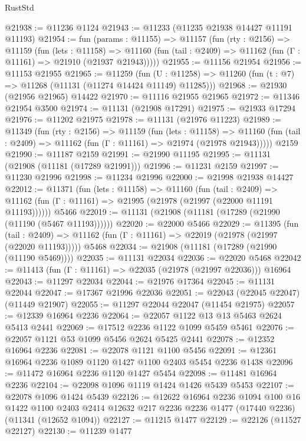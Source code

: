 \begin{lexlean}{RustStd}
\begin{coremodule}
@21938 := @11236 @1124
@21943 := @11233 (@11235 @21938 @14427 @11191 @11193)
@21954 := fun (params : @11155) =>
  @11157
    (fun (rty : @2156) =>
    @11159
      (fun (lets : @11158) =>
      @11160 (fun (tail : @2409) => @11162 (fun (Γ : @11161) => @21910 (@21937 @21943)))))
@21955 := @11156 @21954
@21956 := @11153 @21955
@21965 := @11259
    (fun (U : @11258) => @11260 (fun (t : @7) => @11268 (@11131 (@11274 @14424 @11149) @11285)))
@21968 := @21930 (@21956 @21965) @14422
@21970 := @11116 @21955 @21965
@21972 := @11346 @21954 @3500
@21974 := @11131 (@21908 @17291)
@21975 := @21933 @17294
@21976 := @11202 @21975
@21978 := @11131 (@21976 @11223)
@21989 := @11349
    (fun (rty : @2156) =>
    @11159
      (fun (lets : @11158) =>
      @11160 (fun (tail : @2409) => @11162 (fun (Γ : @11161) => @21974 (@21978 @21943)))))
    @2159
@21990 := @11187 @2159
@21991 := @21990 @11195
@21995 := @11131 (@21908 (@11181 (@17289 @21991)))
@21996 := @11231 @2159
@21997 := @11230 @21996
@21998 := @11234 @21996
@22000 := @21998 @21938 @14427
@22012 := @11371
    (fun (lets : @11158) =>
    @11160
      (fun (tail : @2409) =>
      @11162 (fun (Γ : @11161) => @21995 (@21978 (@21997 (@22000 @11191 @11193))))))
    @5466
@22019 := @11131 (@21908 (@11181 (@17289 (@21990 (@11190 (@5467 @11193))))))
@22020 := @22000 @5466
@22029 := @11395
    (fun (tail : @2409) => @11162 (fun (Γ : @11161) => @22019 (@21978 (@21997 (@22020 @11193)))))
    @5468
@22034 := @21908 (@11181 (@17289 (@21990 (@11190 @5469))))
@22035 := @11131 @22034
@22036 := @22020 @5468
@22042 := @11413 (fun (Γ : @11161) => @22035 (@21978 (@21997 @22036))) @16964
@22043 := @11297 @22034
@22044 := @21976 @17364
@22045 := @11131 @22044
@22047 := @17367 @21996 @22036
@22051 := @22043 (@22045 @22047) (@11449 @21907)
@22055 := @11297 @22044 @22047 (@11454 @21975)
@22057 := @12339 @16964 @2236
@22064 := @22057 @1122 @13 @13 @5463 @2624 @5413 @2441
@22069 := @17512 @2236 @1122 @1099 @5459 @5461
@22076 := @22057 @1121 @53 @1099 @5456 @2624 @5425 @2441
@22078 := @12352 @16964 @2236
@22081 := @22078 @1121 @1100 @5456
@22091 := @12361 @16964 @2236 @1089 @1120 @1427 @1100 @2403 @5454 @2236 @1438
@22096 := @11472 @16964 @2236 @1120 @1427 @5454
@22098 := @11481 @16964 @2236
@22104 := @22098 @1096 @1119 @1424 @1426 @5439 @5453
@22107 := @22078 @1096 @1424 @5439
@22126 := @12622
    @16964
    @2236
    @1094
    @100
    @16
    @1422
    @1100
    @2403
    @2414
    @12632
    @217
    @2236
    @2236
    @1477
    (@17440 @2236)
    (@11341 (@12652 @1094))
@22127 := @11215 @1477
@22129 := @22126 (@11527 @22127)
@22130 := @11239 @1477

\end{coremodule}
\end{lexlean}
